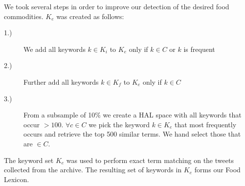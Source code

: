 \documentclass[12pt]{report}
\begin{document}
We took several  steps in order to improve our detection of the desired food commodities. $K_e$ was created as follows: 
\begin{description}
  \item[1.)] We add all keywords $k \in K_i$ to  $K_e$ only if $k \in C $ or $k$ is frequent 
  \item[2.)] Further add all keywords $ k \in K_f$ to $K_e$ only if $k \in C$
  \item[3.)] From a subsample of 10\% we create a HAL space with all keywords that occur $> 100$. $\forall c \in C $ we pick the keyword $k\in K_e$ that most frequently occurs and retrieve the top 500 similar terms. We hand select those that are $\in C$.
\end{description}

 
The keyword set $K_e$ was used to perform exact term matching on the tweets collected from the archive. The resulting set of keywords in $K_e$ forms our Food Lexicon.  
\end{document}
